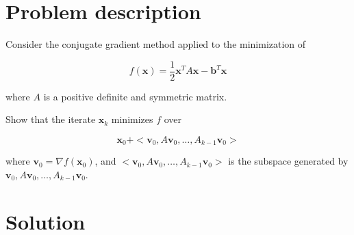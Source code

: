 \documentclass[11pt,a4paper]{article}
\begin{document}
\setlength{\parskip}{1em}


\section{Problem description}

Consider the conjugate gradient method applied to the minimization of

\[
  f(\mathbf{x}) = \frac{1}{2} \mathbf{x}^TA\mathbf{x} - \mathbf{b}^T\mathbf{x}
\]

\noindent where $A$ is a positive definite and symmetric matrix.

\noindent Show that the iterate $\mathbf{x}_k$ minimizes $f$ over

\[
  \mathbf{x}_0 + < \mathbf{v}_0, A\mathbf{v}_0, \dots , A_{k-1}\mathbf{v}_0 >
\]

\noindent where $\mathbf{v}_0 = \nabla f(\mathbf{x}_0)$, and
$< \mathbf{v}_0, A\mathbf{v}_0, \dots , A_{k-1}\mathbf{v}_0 >$ is the subspace generated
by $\mathbf{v}_0, A\mathbf{v}_0, \dots , A_{k-1}\mathbf{v}_0$.

\section{Solution}
\end{document}
